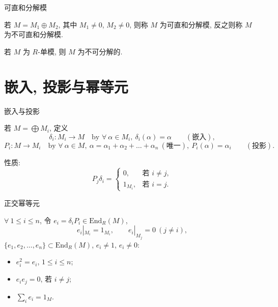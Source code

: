 
\begin{frame}{可直和分解模}

\begin{Def}[可直和分解模]
若 $M = M_1 \oplus M_2$, 其中 $M_1 \neq 0$, $M_2 \neq 0$,
则称 $M$ 为可直和分解模, 反之则称 $M$ 为不可直和分解模.
\end{Def}

\pause

\begin{eg}
若 $M$ 为 $R$-单模, 则 $M$ 为不可分解的.
\end{eg}

\end{frame}


\section[幂等元]{嵌入, 投影与幂等元}


\begin{frame}{嵌入与投影}

若 $M = \bigoplus M_i$, 定义
\[
\delta_i : M_i \to M \quad \text{by } \forall\ \alpha \in M_i,\ \delta_i(\alpha) = \alpha
\qquad (\text{嵌入}),
\]
\[
P_i : M \to M_i \quad \text{by } \forall\ \alpha \in M,\
\alpha = \alpha_1 + \alpha_2 + \dots + \alpha_n\ (\text{唯一}),\
P_i(\alpha) = \alpha_i
\qquad (\text{投影}).
\]

\pause

性质:
\[
P_j \delta_i =
\begin{cases}
0, & \text{若 } i \neq j, \\
1_{M_i}, & \text{若 } i = j.
\end{cases}
\]

\end{frame}


\begin{frame}{正交幂等元}

$\forall\ 1 \leq i \leq n$, 令 $e_i = \delta_i P_i \in \mathrm{End}_R(M)$,
\[
e_i|_{M_i} = 1_{M_i}, \qquad e_i|_{M_j} = 0 \ (j \neq i),
\]
$\{ e_1, e_2, \dots, e_n \} \subset \mathrm{End}_R(M)$, $e_i \neq 1$, $e_i \neq 0$:
\begin{itemize}
\item \circled{1} $e_i^2 = e_i$, $1 \leq i \leq n$;
\item {} $e_i e_j = 0$, 若 $i \neq j$;
\item \circled{3} $\sum_i e_i = 1_M$.
\end{itemize}

\end{frame}

